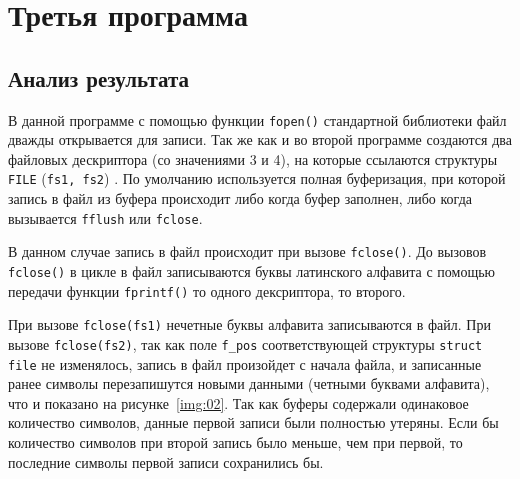 \chapter{Третья программа}

\vspace{-0.5cm}




\vspace{-1cm}
\section*{Анализ результата}

В данной программе с помощью функции \texttt{fopen()} стандартной
библиотеки файл дважды открывается для записи. Так же как и во второй программе
создаются два файловых дескриптора (со значениями 3 и 4), на которые
ссылаются структуры \texttt{FILE} (\texttt{fs1, fs2}) . По умолчанию используется полная
буферизация, при которой запись в файл из буфера происходит либо когда буфер
заполнен, либо когда вызывается \texttt{fflush} или
\texttt{fclose}.

В данном случае запись в файл происходит при вызове \texttt{fclose()}. До
вызовов \texttt{fclose()} в цикле в файл записываются буквы латинского
алфавита с помощью передачи функции \texttt{fprintf()} то одного
дексриптора, то второго.

При вызове \texttt{fclose(fs1)} нечетные буквы алфавита записываются в файл.
При вызове \texttt{fclose(fs2)}, так как поле \texttt{f\_pos}
соответствующей структуры \texttt{struct file} не изменялось, запись в файл
произойдет с начала файла, и записанные ранее символы перезапишутся новыми
данными (четными буквами алфавита), что и показано на рисунке~\ref{img:02}.
Так как буферы содержали одинаковое количество символов, данные первой
записи были полностью утеряны. Если бы количество символов при второй
запись было меньше, чем при первой, то последние символы первой записи
сохранились бы.




